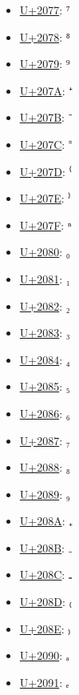 \begin{itemize}
	\item \href{https://decodeunicode.org/en/u+2077}{U+2077}: ⁷
	\item \href{https://decodeunicode.org/en/u+2078}{U+2078}: ⁸
	\item \href{https://decodeunicode.org/en/u+2079}{U+2079}: ⁹
	\item \href{https://decodeunicode.org/en/u+207A}{U+207A}: ⁺
	\item \href{https://decodeunicode.org/en/u+207B}{U+207B}: ⁻
	\item \href{https://decodeunicode.org/en/u+207C}{U+207C}: ⁼
	\item \href{https://decodeunicode.org/en/u+207D}{U+207D}: ⁽
	\item \href{https://decodeunicode.org/en/u+207E}{U+207E}: ⁾
	\item \href{https://decodeunicode.org/en/u+207F}{U+207F}: ⁿ
	\item \href{https://decodeunicode.org/en/u+2080}{U+2080}: ₀
	\item \href{https://decodeunicode.org/en/u+2081}{U+2081}: ₁
	\item \href{https://decodeunicode.org/en/u+2082}{U+2082}: ₂
	\item \href{https://decodeunicode.org/en/u+2083}{U+2083}: ₃
	\item \href{https://decodeunicode.org/en/u+2084}{U+2084}: ₄
	\item \href{https://decodeunicode.org/en/u+2085}{U+2085}: ₅
	\item \href{https://decodeunicode.org/en/u+2086}{U+2086}: ₆
	\item \href{https://decodeunicode.org/en/u+2087}{U+2087}: ₇
	\item \href{https://decodeunicode.org/en/u+2088}{U+2088}: ₈
	\item \href{https://decodeunicode.org/en/u+2089}{U+2089}: ₉
	\item \href{https://decodeunicode.org/en/u+208A}{U+208A}: ₊
	\item \href{https://decodeunicode.org/en/u+208B}{U+208B}: ₋
	\item \href{https://decodeunicode.org/en/u+208C}{U+208C}: ₌
	\item \href{https://decodeunicode.org/en/u+208D}{U+208D}: ₍
	\item \href{https://decodeunicode.org/en/u+208E}{U+208E}: ₎
	\item \href{https://decodeunicode.org/en/u+2090}{U+2090}: ₐ
	\item \href{https://decodeunicode.org/en/u+2091}{U+2091}: ₑ

\end{itemize}
